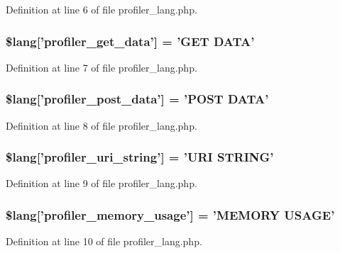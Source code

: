 Definition at line 6 of file profiler\-\_\-lang.\-php.

\subsubsection[{\$lang}]{\setlength{\rightskip}{0pt plus 5cm}\$lang['profiler\-\_\-get\-\_\-data'] = 'G\-E\-T D\-A\-T\-A'}\label{profiler__lang_8php_aed0d74a29b2ef17977baa94091d06058}


Definition at line 7 of file profiler\-\_\-lang.\-php.

\subsubsection[{\$lang}]{\setlength{\rightskip}{0pt plus 5cm}\$lang['profiler\-\_\-post\-\_\-data'] = 'P\-O\-S\-T D\-A\-T\-A'}\label{profiler__lang_8php_a6b2928f829db3649049332dc4468018d}


Definition at line 8 of file profiler\-\_\-lang.\-php.

\subsubsection[{\$lang}]{\setlength{\rightskip}{0pt plus 5cm}\$lang['profiler\-\_\-uri\-\_\-string'] = 'U\-R\-I S\-T\-R\-I\-N\-G'}\label{profiler__lang_8php_a1f1644f4e586555cb83f718552502136}


Definition at line 9 of file profiler\-\_\-lang.\-php.

\subsubsection[{\$lang}]{\setlength{\rightskip}{0pt plus 5cm}\$lang['profiler\-\_\-memory\-\_\-usage'] = 'M\-E\-M\-O\-R\-Y U\-S\-A\-G\-E'}\label{profiler__lang_8php_aaffc8cc3dd25f21388a6edb5fbfc8859}


Definition at line 10 of file profiler\-\_\-lang.\-php.

